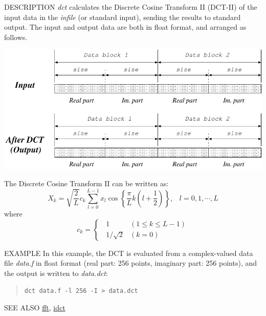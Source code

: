 \begin{synopsis}
\item[dct] [ --l $L$ ] [ --I ] [ --d ] [ {\em infile} ]
\end{synopsis}

\begin{qsection}{DESCRIPTION}
{\em dct} calculates the Discrete Cosine Transform II (DCT-II)
of the input data in the {\em infile} (or standard input),
sending the results to standard output.
The input and output data are both in float format, and arranged as follows.
\begin{center}
 \leavevmode
 \includegraphics{fig/dct.pdf}
\end{center}
The Discrete Cosine Transform II can be written as:
\begin{displaymath}
 X_{k} =  \sqrt{\frac{2}{L}}c_{k}\sum_{l=0}^{L-1}
x_{l}\cos\left\{\frac{\pi}{L} k \left( l + \frac{1}{2} \right) \right\},
\;\;\; l = 0, 1, \cdots, L
\end{displaymath}
 where
 \begin{displaymath}
  c_{k}= \begin{cases}
         \;\;1 & ( 1 \le k \le L - 1 ) \\
         \;\; 1 / \sqrt{2} & (k = 0)
         \end{cases}
 \end{displaymath}
\par
\end{qsection}

\begin{options}
\end{options}

\begin{qsection}{EXAMPLE}
In this example, the DCT is evaluated from a complex-valued data file
{\em data.f} in float format
(real part: 256 points, imaginary part: 256 points),
and the output is written to {\em data.dct}:
\begin{quote}
  \verb!dct data.f -l 256 -I > data.dct!
\end{quote}
\end{qsection}

\begin{qsection}{SEE ALSO}
\hyperlink{fft}{fft},
\hyperlink{idct}{idct}
\end{qsection}
